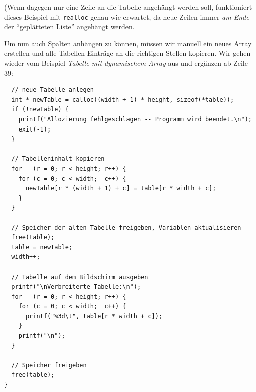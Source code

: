 \begin{tcolorbox}[title=Visualisierung: Abbild der Tabelle im Speicher]
\end{tcolorbox}

(Wenn dagegen nur eine Zeile an die Tabelle angehängt werden soll, funktioniert dieses Beispiel mit \texttt{realloc} genau wie erwartet, da neue Zeilen immer \emph{am Ende} der \enquote{geplätteten Liste} angehängt werden.

Um nun auch Spalten anhängen zu können, müssen wir manuell ein neues Array erstellen und alle Tabellen-Einträge an die richtigen Stellen kopieren. Wir gehen wieder vom Beispiel \emph{Tabelle mit dynamischem Array} aus und ergänzen ab Zeile 39:

\begin{codebox}
\begin{verbatim}
  // neue Tabelle anlegen
  int * newTable = calloc((width + 1) * height, sizeof(*table));
  if (!newTable) {
    printf("Allozierung fehlgeschlagen -- Programm wird beendet.\n");
    exit(-1);
  }
  
  // Tabelleninhalt kopieren
  for   (r = 0; r < height; r++) {
    for (c = 0; c < width;  c++) {
      newTable[r * (width + 1) + c] = table[r * width + c];
    }
  }
  
  // Speicher der alten Tabelle freigeben, Variablen aktualisieren
  free(table);
  table = newTable;
  width++;
  
  // Tabelle auf dem Bildschirm ausgeben
  printf("\nVerbreiterte Tabelle:\n");
  for   (r = 0; r < height; r++) {
    for (c = 0; c < width;  c++) {
      printf("%3d\t", table[r * width + c]);
    }
    printf("\n");
  }
  
  // Speicher freigeben
  free(table);
}
\end{verbatim}
\end{codebox}

